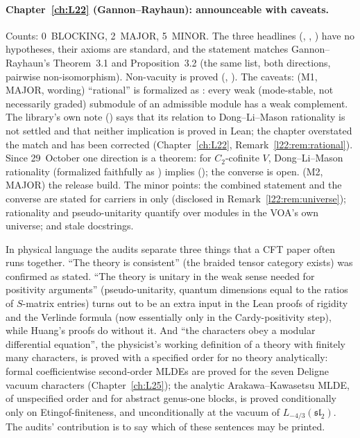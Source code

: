 \paragraph{Chapter~\ref{ch:L22} (Gannon--Rayhaun): announceable with caveats.} Counts: 0~BLOCKING, 2~MAJOR, 5~MINOR. The
three headlines (, , )
have no hypotheses, their axioms are standard, and the statement matches Gannon--Rayhaun's Theorem~3.1 and
Proposition~3.2 (the same list, both directions, pairwise non-isomorphism). Non-vacuity is proved (,
). The caveats: (M1, MAJOR, wording) ``rational'' is formalized as
: every weak (mode-stable, not necessarily graded) submodule of an admissible module has a
weak complement. The library's own note () says that its relation to
Dong--Li--Mason rationality is not settled and that neither implication is proved in Lean; the chapter overstated the
match and has been corrected (Chapter~\ref{ch:L22}, Remark~\ref{l22:rem:rational}). Since 29~October one direction is a
theorem: for $C_2$-cofinite $V$, Dong--Li--Mason rationality (formalized faithfully as ) implies
 (); the converse is
open. (M2, MAJOR) the release build. The
minor points: the combined statement and the converse are stated for carriers in  only (disclosed in
Remark~\ref{l22:rem:universe}); rationality and pseudo-unitarity quantify over modules in the VOA's own universe; and
stale docstrings.

\begin{physics}
In physical language the audits separate three things that a CFT paper often runs together. ``The theory is
consistent'' (the braided tensor category exists) was confirmed as stated. ``The theory is unitary in the weak sense
needed for positivity arguments'' (pseudo-unitarity, quantum dimensions equal to the ratios of $S$-matrix entries) turns
out to be an extra input in the Lean proofs of rigidity and the Verlinde formula (now essentially only in the
Cardy-positivity step), while Huang's proofs do without it.
And ``the characters obey a modular differential equation'', the physicist's working definition of a theory with
finitely many characters, is proved with a specified order for no theory analytically: formal coefficientwise
second-order MLDEs are proved for the seven Deligne vacuum characters (Chapter~\ref{ch:L25}); the analytic
Arakawa--Kawasetsu MLDE, of unspecified order and for abstract genus-one blocks, is proved conditionally only on
Etingof-finiteness, and unconditionally at the vacuum of $L_{-4/3}(\mathfrak{sl}_2)$. The audits'
contribution is to say which of these sentences may be printed.
\end{physics}

